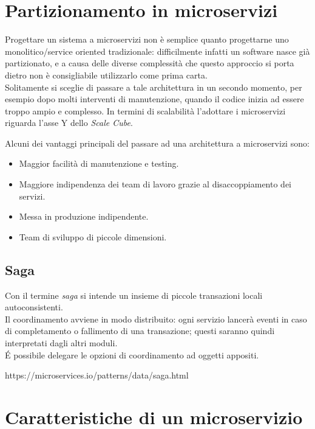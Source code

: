 \section{Partizionamento in microservizi}
Progettare un sistema a microservizi non è semplice quanto progettarne uno monolitico/service oriented tradizionale: difficilmente infatti un software nasce già partizionato, e a causa delle diverse complessità che questo approccio si porta dietro non è consigliabile utilizzarlo come prima carta.\\
Solitamente si sceglie di passare a tale architettura in un secondo momento, per esempio dopo molti interventi di manutenzione, quando il codice inizia ad essere troppo ampio e complesso.\cite{microservices_architecture}
In termini di scalabilità l'adottare i microservizi riguarda l'asse Y dello \textit{Scale Cube}.

Alcuni dei vantaggi principali del passare ad una architettura a microservizi sono:
\begin{itemize}
	\item Maggior facilità di manutenzione e testing.
	\item Maggiore indipendenza dei team di lavoro grazie al disaccoppiamento dei servizi.
	\item Messa in produzione indipendente.
	\item Team di sviluppo di piccole dimensioni.
\end{itemize}

\subsection{Saga}
Con il termine \textit{saga} si intende un insieme di piccole transazioni locali autoconsistenti.\\
Il coordinamento avviene in modo distribuito: ogni servizio lancerà eventi in caso di completamento o fallimento di una transazione; questi saranno quindi interpretati dagli altri moduli.\\
\'E possibile delegare le opzioni di coordinamento ad oggetti appositi.

https://microservices.io/patterns/data/saga.html

\section{Caratteristiche di un microservizio}

